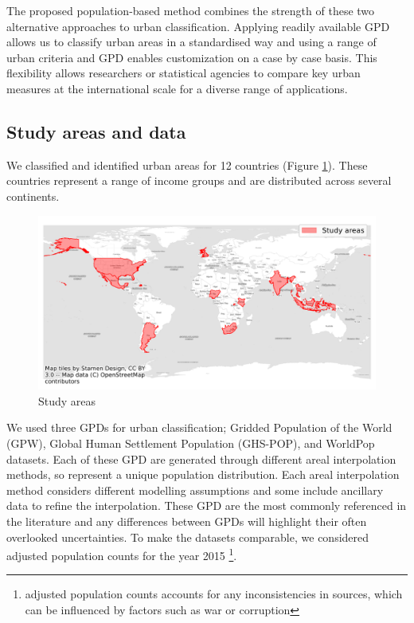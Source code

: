 \documentclass[review]{elsarticle}
\begin{document}
	
	The proposed population-based method combines the strength of these two alternative approaches to urban classification.
	Applying readily available GPD allows us to classify urban areas in a standardised way and using a range of urban criteria and GPD enables customization on a case by case basis.
	This flexibility allows researchers or statistical agencies to compare key urban measures at the international scale for a diverse range of applications. 
	
	
	\subsection{Study areas and data} 
	We classified and identified urban areas for 12 countries (Figure \ref{fig:study_areas}). 
	These countries represent a range of income groups and are distributed across several continents.
	
	
	\begin{figure}[H]
		\includegraphics[width=\textwidth]{study_areas}
		\caption{Study areas}
		\label{fig:study_areas}
	\end{figure}
	
	
	We used three GPDs for urban classification; Gridded Population of the World (GPW), Global Human Settlement Population (GHS-POP), and WorldPop datasets.
	Each of these GPD are generated through different areal interpolation methods, so represent a unique population distribution.
	Each areal interpolation method considers different modelling assumptions and some include ancillary data to refine the interpolation.
	These GPD are the most commonly referenced in the literature and any differences between GPDs will highlight their often overlooked uncertainties.
	To make the datasets comparable, we considered adjusted population counts for the year 2015 \footnote{adjusted population counts accounts for any inconsistencies in sources, which can be influenced by factors such as war or corruption}.
	
\end{document}
